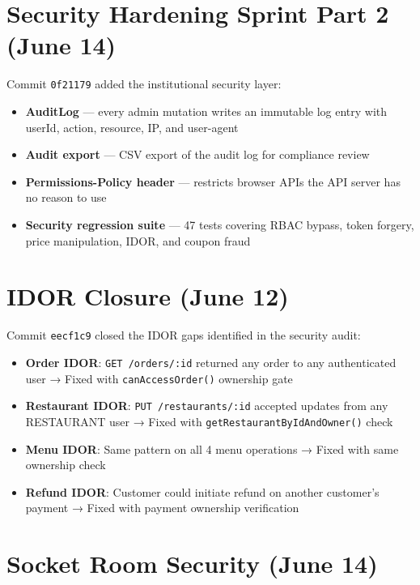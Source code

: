 \documentclass[11pt,a4paper,twoside]{book}
\begin{document}
\section{Security Hardening Sprint Part 2 (June 14)}

Commit \texttt{0f21179} added the institutional security layer:

\begin{itemize}[leftmargin=1.4em]
  \item \textbf{AuditLog} — every admin mutation writes an immutable log entry with userId, action, resource, IP, and user-agent
  \item \textbf{Audit export} — CSV export of the audit log for compliance review
  \item \textbf{Permissions-Policy header} — restricts browser APIs the API server has no reason to use
  \item \textbf{Security regression suite} — 47 tests covering RBAC bypass, token forgery, price manipulation, IDOR, and coupon fraud
\end{itemize}

\section{IDOR Closure (June 12)}

Commit \texttt{eecf1c9} closed the IDOR gaps identified in the security audit:

\begin{tcolorbox}[crit,title=IDOR Vulnerabilities Found \& Fixed]
\begin{itemize}[leftmargin=1em,nosep]
  \item \textbf{Order IDOR}: \texttt{GET /orders/:id} returned any order to any authenticated user → Fixed with \texttt{canAccessOrder()} ownership gate
  \item \textbf{Restaurant IDOR}: \texttt{PUT /restaurants/:id} accepted updates from any RESTAURANT user → Fixed with \texttt{getRestaurantByIdAndOwner()} check
  \item \textbf{Menu IDOR}: Same pattern on all 4 menu operations → Fixed with same ownership check
  \item \textbf{Refund IDOR}: Customer could initiate refund on another customer's payment → Fixed with payment ownership verification
\end{itemize}
\end{tcolorbox}

\section{Socket Room Security (June 14)}
\end{document}
